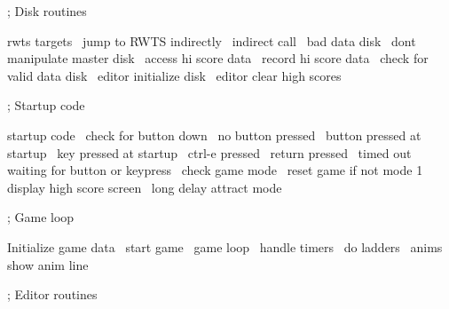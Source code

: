 \documentclass[10pt]{report}%
\begin{document}
    ; Disk routines

    \LA{}rwts targets~{\nwtagstyle{}}\RA{}
    \LA{}jump to RWTS indirectly~{\nwtagstyle{}}\RA{}
    \LA{}indirect call~{\nwtagstyle{}}\RA{}
    \LA{}bad data disk~{\nwtagstyle{}}\RA{}
    \LA{}dont manipulate master disk~{\nwtagstyle{}}\RA{}
    \LA{}access hi score data~{\nwtagstyle{}}\RA{}
    \LA{}record hi score data~{\nwtagstyle{}}\RA{}
    \LA{}check for valid data disk~{\nwtagstyle{}}\RA{}
    \LA{}editor initialize disk~{\nwtagstyle{}}\RA{}
    \LA{}editor clear high scores~{\nwtagstyle{}}\RA{}

    ; Startup code

    \LA{}startup code~{\nwtagstyle{}}\RA{}
    \LA{}check for button down~{\nwtagstyle{}}\RA{}
    \LA{}no button pressed~{\nwtagstyle{}}\RA{}
    \LA{}button pressed at startup~{\nwtagstyle{}}\RA{}
    \LA{}key pressed at startup~{\nwtagstyle{}}\RA{}
    \LA{}ctrl-e pressed~{\nwtagstyle{}}\RA{}
    \LA{}return pressed~{\nwtagstyle{}}\RA{}
    \LA{}timed out waiting for button or keypress~{\nwtagstyle{}}\RA{}
    \LA{}check game mode~{\nwtagstyle{}}\RA{}
    \LA{}reset game if not mode 1~{\nwtagstyle{}}\RA{}
    \LA{}display high score screen~{\nwtagstyle{}}\RA{}
    \LA{}long delay attract mode~{\nwtagstyle{}}\RA{}

    ; Game loop

    \LA{}Initialize game data~{\nwtagstyle{}}\RA{}
    \LA{}start game~{\nwtagstyle{}}\RA{}
    \LA{}game loop~{\nwtagstyle{}}\RA{}
    \LA{}handle timers~{\nwtagstyle{}}\RA{}
    \LA{}do ladders~{\nwtagstyle{}}\RA{}
    \LA{}anims~{\nwtagstyle{}}\RA{}
    \LA{}show anim line~{\nwtagstyle{}}\RA{}

    ; Editor routines
\end{document}
